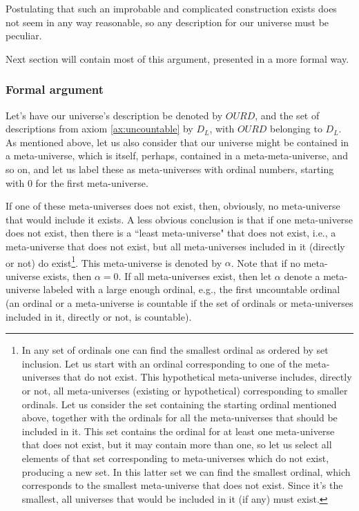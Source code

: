 \documentclass[a4paper
,draft
]{article}
\def\descriptions{D_L}
\def\our_description{OURD}
\newcommand{\ghilimele}[1]{``#1"}
\begin{document}
Postulating that such an improbable and complicated construction exists does
not seem in any way reasonable,
so any description for our universe must be peculiar.

Next section will contain most of this argument, presented in a more formal way.

\subsubsection{Formal argument}

Let's have our universe's description be denoted by
$\our_description$, and the set of descriptions from
axiom \ref{ax:uncountable} by $\descriptions$,
with $\our_description$ belonging to $\descriptions$.
As mentioned above, let us also consider that our universe might be
contained in a meta-universe, which is itself, perhaps, contained in
a meta-meta-universe, and so on, and let us label these as meta-universes
with ordinal numbers, starting with $0$ for the first meta-universe.

If one of these meta-universes does not exist, then, obviously, no meta-universe
that would include it exists. A less obvious conclusion is that if one
meta-universe does not exist, then there is a \ghilimele{least meta-universe}
that does not exist, i.e., a meta-universe that does not exist,
but all meta-universes
included in it (directly or not) do exist\footnote{In any set of ordinals
  one can find the smallest ordinal as ordered by set inclusion.
  Let us start with an ordinal corresponding to one of the
  meta-universes that do not exist.
  This hypothetical meta-universe includes, directly or not,
  all meta-universes (existing or hypothetical)
  corresponding to smaller ordinals.
  Let us consider the set containing the starting ordinal mentioned above,
  together with the ordinals for all the meta-universes
  that should be included in it.
  This set contains the ordinal for at least
  one meta-universe that does not exist,
  but it may contain more than one,
  so let us select all elements of that set corresponding
  to meta-universes which do not exist, producing a new set.
  In this latter set we can find the smallest ordinal, which corresponds
  to the smallest meta-universe that does not exist.
  Since it's the smallest, all universes that would be
  included in it (if any) must exist.
}. This meta-universe is denoted by $\alpha$. Note
that if no meta-universe exists, then $\alpha=0$. If all
meta-universes exist, then let $\alpha$ denote a meta-universe labeled
with a large enough ordinal, e.g., the first uncountable ordinal
(an ordinal or a meta-universe is countable if the set of ordinals or
meta-universes included in it, directly or not, is countable).
\end{document}
